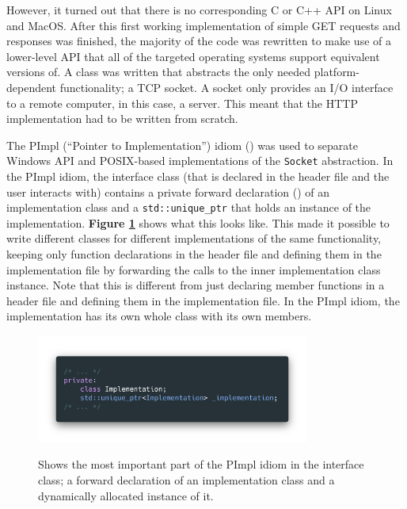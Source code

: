 \documentclass[12pt, a4paper]{article}
\begin{document}
However, it turned out that there is no corresponding C or C++ API on Linux and MacOS. After this first working implementation of simple GET requests and responses was finished, the majority of the code was rewritten to make use of a lower-level API that all of the targeted operating systems support equivalent versions of. A class was written that abstracts the only needed platform-dependent functionality; a TCP socket. A socket only provides an I/O interface to a remote computer, in this case, a server. This meant that the HTTP implementation had to be written from scratch.

The PImpl (“Pointer to Implementation”) idiom (\cite{CppPImplIdiom}) was used to separate Windows API and POSIX-based implementations of the \texttt{Socket} abstraction. In the PImpl idiom, the interface class (that is declared in the header file and the user interacts with) contains a private forward declaration (\cite{CppClassDeclaration}) of an implementation class and a \texttt{std::unique\_ptr} that holds an instance of the implementation. \textbf{Figure \ref{fig:pimpl_forward_declaration}} shows what this looks like. This made it possible to write different classes for different implementations of the same functionality, keeping only function declarations in the header file and defining them in the implementation file by forwarding the calls to the inner implementation class instance. Note that this is different from just declaring member functions in a header file and defining them in the implementation file. In the PImpl idiom, the implementation has its own whole class with its own members.

\begin{figure}[hp]
	\centering
	\caption{Shows the most important part of the PImpl idiom in the interface class; a forward declaration of an implementation class and a dynamically allocated instance of it.}
	\includegraphics[width=0.8\textwidth]{pimpl_forward_declaration}
	\label{fig:pimpl_forward_declaration}
\end{figure}
\end{document}
